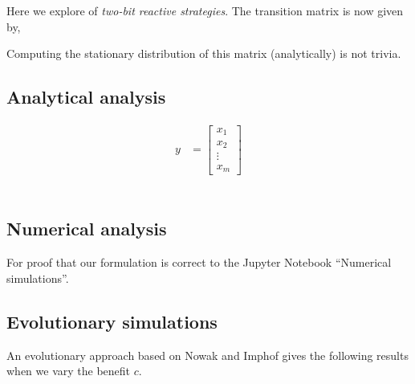 \documentclass{article}
\begin{document}
Here we explore of \textit{two-bit reactive strategies}. The transition matrix
is now given by,


Computing the stationary distribution of this matrix (analytically) is not
trivia.

\subsection{Analytical analysis}


\begin{align}
  y &= \begin{bmatrix}
         x_{1} \\
         x_{2} \\
         \vdots \\
         x_{m}
       \end{bmatrix}
\end{align}


\begin{align}
[   &  p_{1}^{2} q_{1}^{2} \\
    &  p_{1}^{2} q_{1} \left(1 -q_{1}\right) \\
    &  p_{1} q_{1}^{2} \left(1 - p_{1}\right) \\ 
    &  p_{1} q_{1} \left(p_{1} -1\right) \left(q_{1} - 1\right) \\
    &  p_{1}^{2} q_{1} \left(1 -q_{1}\right) \\
    &  p_{1}^{2} \left(q_{1} - 1\right)^{2}\\
    &  p_{1} q_{1} \left(p_{1} - 1\right) \left(q_{1} - 1\right)\\
    &  - p_{1} \left(p_{1} - 1\right) \left(q_{1} - 1\right)^{2}\\
    & p_{1} q_{1}^{2} \left(1 - p_{1}\right)\\
    & p_{1} q_{1} \left(p_{1} - 1\right) \left(q_{1} - 1\right)\\
    & q_{1}^{2} \left(p_{1} - 1\right)^{2} \\
    & - q_{1}\left(p_{1} - 1\right)^{2} \left(q_{1} - 1\right)\\
    & p_{1} q_{1} \left(p_{1} - 1\right) \left(q_{1} - 1\right)\\
    & - p_{1} \left(p_{1} - 1\right) \left(q_{1} - 1\right)^{2}\\
    & - q_{1} \left(p_{1} - 1\right)^{2} \left(q_{1} - 1\right)\\
    & \left(p_{1} - 1\right)^{2} \left(q_{1} - 1\right)^{2}]
\end{align}


\subsection{Numerical analysis}

For proof that our formulation is correct to the Jupyter Notebook ``Numerical simulations''.

\subsection{Evolutionary simulations}

An evolutionary approach based on Nowak and Imphof gives the following
results when we vary the benefit \(c\).
\end{document}
